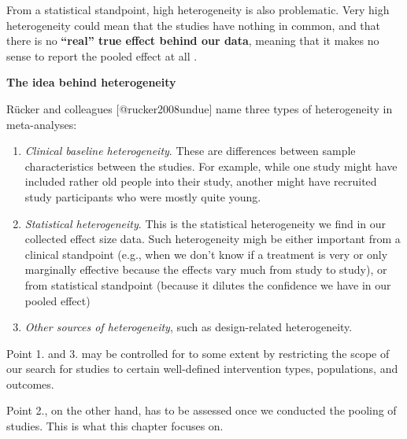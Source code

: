 \documentclass[]{book}
\providecommand{\tightlist}{%
  \setlength{\itemsep}{0pt}\setlength{\parskip}{0pt}}
\theoremstyle{definition}
\theoremstyle{definition}
\theoremstyle{definition}
\theoremstyle{remark}
\begin{document}
From a statistical standpoint, high heterogeneity is also problematic.
Very high heterogeneity could mean that the studies have nothing in
common, and that there is no \textbf{``real'' true effect behind our
data}, meaning that it makes no sense to report the pooled effect at all
\citep{borenstein2011}.

\begin{rmdinfo}
\textbf{The idea behind heterogeneity}

Rücker and colleagues {[}@rucker2008undue{]} name three types of
heterogeneity in meta-analyses:

\begin{enumerate}
\def\labelenumi{\arabic{enumi}.}
\tightlist
\item
  \emph{Clinical baseline heterogeneity}. These are differences between
  sample characteristics between the studies. For example, while one
  study might have included rather old people into their study, another
  might have recruited study participants who were mostly quite young.
\item
  \emph{Statistical heterogeneity}. This is the statistical
  heterogeneity we find in our collected effect size data. Such
  heterogeneity migh be either important from a clinical standpoint
  (e.g., when we don't know if a treatment is very or only marginally
  effective because the effects vary much from study to study), or from
  statistical standpoint (because it dilutes the confidence we have in
  our pooled effect)
\item
  \emph{Other sources of heterogeneity}, such as design-related
  heterogeneity.
\end{enumerate}

Point 1. and 3. may be controlled for to some extent by restricting the
scope of our search for studies to certain well-defined intervention
types, populations, and outcomes.

Point 2., on the other hand, has to be assessed once we conducted the
pooling of studies. This is what this chapter focuses on.
\end{rmdinfo}
\end{document}
